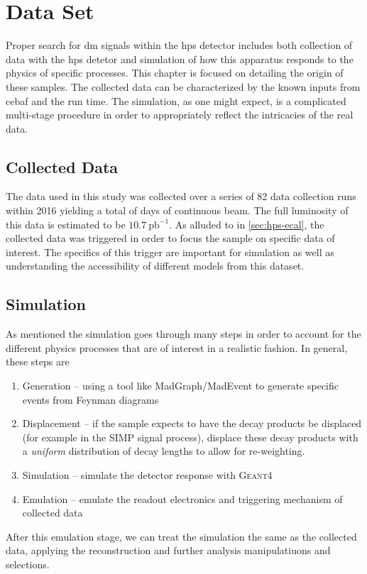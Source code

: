 \chapter{Data Set}
\label{chapter:hps:dataset}

Proper search for \ac{dm} signals within the \ac{hps} detector includes both collection
of data with the \ac{hps} detetor and simulation of how this apparatus responds to the
physics of specific processes.
This chapter is focused on detailing the origin of these samples.
The collected data can be characterized by the known inputs from \ac{cebaf}
and the run time.
The simulation, as one might expect, is a complicated multi-stage procedure in order
to appropriately reflect the intricacies of the real data.

\section{Collected Data} \label{sec:hps:data}
The data used in this study was collected over a series of 82 data collection runs
within 2016 yielding a total of 
days of continuous beam.
The full luminosity of this data is estimated to be $10.7~\text{pb}^{-1}$.
As alluded to in \cref{sec:hps-ecal}, the collected data was triggered in order
to focus the sample on specific data of interest.
The specifics of this trigger are important for simulation as well as understanding
the accessibility of different models from this dataset.

\section{Simulation} \label{sec:hps:sim}
As mentioned the simulation goes through many steps in order to account
for the different physics processes that are of interest in a realistic fashion.
In general, these steps are
\begin{enumerate}
	\item Generation -- using a tool like {\sc MadGraph/MadEvent}
	to generate specific events from Feynman diagrams
	\item Displacement -- if the sample expects to have the decay products be displaced
	(for example in the SIMP signal process), displace these decay products
	with a \emph{uniform} distribution of decay lengths to allow for re-weighting.
	\item Simulation -- simulate the detector response with \textsc{Geant4}\cite{geant4}
	\item Emulation -- emulate the readout electronics and triggering mechanism
	of collected data
\end{enumerate}
After this emulation stage, we can treat the simulation the same as the collected data,
applying the reconstruction and further analysis manipulatiuons and selections.

